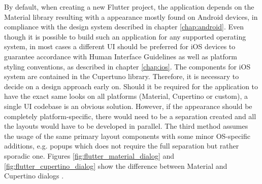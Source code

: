 By default, when creating a new Flutter project, the application depends on the Material library resulting with a appearance mostly found on Android devices, in compliance with the design system described in chapter \ref{chap:android}. Even though it is possible to build such an application for any supported operating system, in most cases a different UI should be preferred for iOS devices to guarantee accordance with Human Interface Guidelines as well as platform styling conventions, as described in chapter \ref{chap:ios}. The components for iOS system are contained in the Cupertuno library. Therefore, it is necessary to decide on a design approach early on. Should it be required for the application to have the exact same looks on all platforms (Material, Cupertino or custom), a single UI codebase is an obvious solution. However, if the appearance should be completely platform-specific, there would need to be a separation created and all the layouts would have to be developed in parallel. The third method assumes the usage of the same primary layout components with some minor OS-specific additions, e.g. popups which does not require the full separation but rather sporadic one. Figures \ref{fig:flutter_material_dialog} and \ref{fig:flutter_cupertino_dialog} show the difference between Material and Cupertino dialogs \cite{flutter_docs_architecture,kosinski_flutter_vs_rn_vs_qt}.

